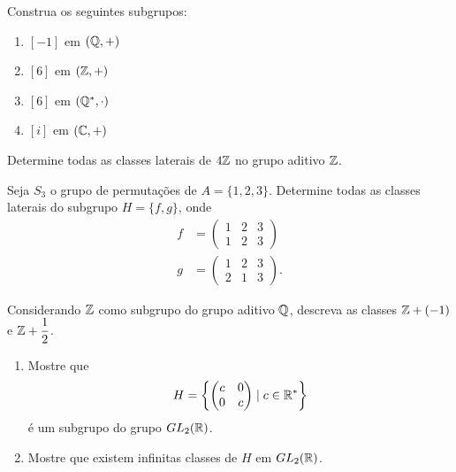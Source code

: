 \documentclass[12pt]{exam}
\begin{document}
    \questao{} Construa os seguintes subgrupos:
    \begin{enumerate}[label={\alph*})]
        \item $[-1]$ em $(\mathbb{Q}, +)$

        \item $[6]$ em $(\mathbb{Z}, +)$

        \item $[6]$ em $(\mathbb{Q}^*, \cdot)$

        \item $[i]$ em $(\mathbb{C}, +)$
    \end{enumerate}

    \vspace{.3cm}

    \questao{} Determine todas as classes laterais de $4\mathbb{Z}$ no grupo aditivo $\mathbb{Z}$.

    \vspace{.3cm}

    \questao{} Seja $S_3$ o grupo de permutações de $A = \{1, 2, 3\}$. Determine todas as classes laterais do subgrupo $H = \{f, g\}$, onde
    \begin{align*}
        f &= \begin{pmatrix}
            1 & 2 & 3\\
            1 & 2 & 3
        \end{pmatrix}\\
        g &= \begin{pmatrix}
            1 & 2 & 3\\
            2 & 1 & 3
        \end{pmatrix}.
    \end{align*}

    \vspace{.3cm}

    \questao{} Considerando $\mathbb{Z}$ como subgrupo do grupo aditivo $\mathbb{Q}$, descreva as classes $\mathbb{Z} + (-1)$ e $\mathbb{Z} + \dfrac{1}{2}$.

    \vspace{.3cm}

    \questao{} \begin{enumerate}[label={\alph*})]
        \item Mostre que
        \[
            H = \left\{\begin{pmatrix}
                c & 0\\
                0 & c
            \end{pmatrix} \mid c \in \mathbb{R}^*\right\}
        \]
        é um subgrupo do grupo $GL_2(\mathbb{R})$.

        \item Mostre que existem infinitas classes de $H$ em $GL_2(\mathbb{R})$.
    \end{enumerate}
\end{document}

